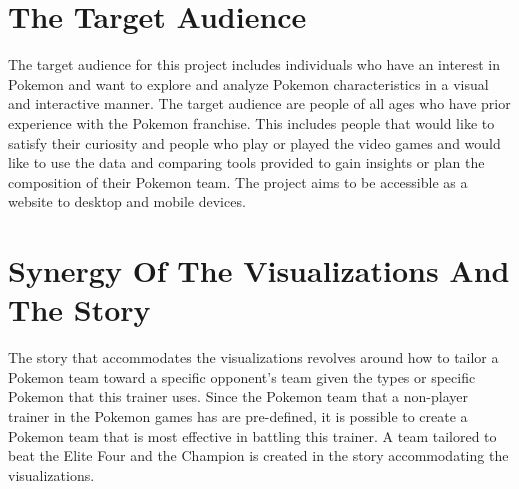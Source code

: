 \documentclass[12pt, a4paper]{article}
\begin{document}
	\section{The Target Audience}
		The target audience for this project includes individuals who have an interest in Pokemon and want to explore and analyze Pokemon characteristics in a visual and interactive manner. The target audience are people of all ages who have prior experience with the Pokemon franchise. This includes people that would like to satisfy their curiosity and people who play or played the video games and would like to use the data and comparing tools provided to gain insights or plan the composition of their Pokemon team. The project aims to be accessible as a website to desktop and mobile devices.

	\section{Synergy Of The Visualizations And The Story}
		The story that accommodates the visualizations revolves around how to tailor a Pokemon team toward a specific opponent's team given the types or specific Pokemon that this trainer uses. Since the Pokemon team that a non-player trainer in the Pokemon games has are pre-defined, it is possible to create a Pokemon team that is most effective in battling this trainer. A team tailored to beat the Elite Four and the Champion is created in the story accommodating the visualizations.
\end{document}

